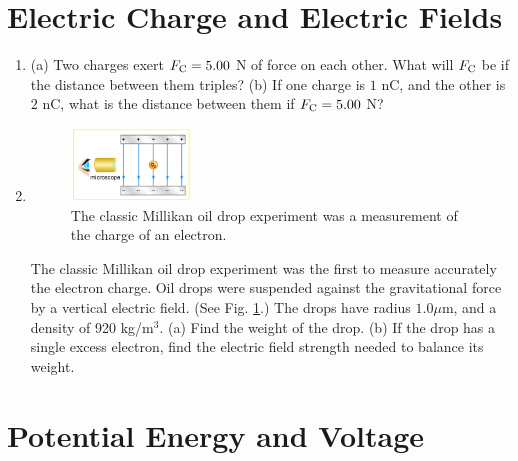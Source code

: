 \documentclass[10pt]{article}
\begin{document}
\maketitle

\section{Electric Charge and Electric Fields}

\begin{enumerate}
\item (a) Two charges exert $F_{\rm C} = 5.00$ N of force on each other. What will $F_{\rm C}$ be if the distance between them triples? (b) If one charge is $1$ nC, and the other is $2$ nC, what is the distance between them if $F_{\rm C} = 5.00$ N? \\ \vspace{1cm}
\item 
\begin{figure}[ht]
\centering
\includegraphics[width=0.3\textwidth]{figures/mill.jpeg}
\caption{\label{fig:mill} The classic Millikan oil drop experiment was a measurement of the charge of an electron.}
\end{figure}
The classic Millikan oil drop experiment was the first to measure accurately the electron charge. Oil drops were suspended against the gravitational force by a vertical electric field. (See Fig. \ref{fig:mill}.) The drops have radius $1.0 \mu$m, and a density of 920 kg/m$^3$. (a) Find the weight of the drop. (b) If the drop has a single excess electron, find the electric field strength needed to balance its weight. \\ \vspace{1.75cm}
\end{enumerate}

\section{Potential Energy and Voltage}
\end{document}
